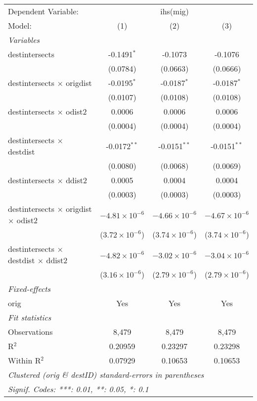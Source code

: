 \begin{tabular}{lccc}
\tabularnewline\midrule\midrule
Dependent Variable:&\multicolumn{3}{c}{ihs(mig)}\\
Model:&(1) & (2) & (3)\\
\midrule \emph{Variables}&   &   &  \\
destintersects & -0.1491$^{*}$ & -0.1073 & -0.1076\\
  &(0.0784) & (0.0663) & (0.0666)\\
destintersects $\times $ origdist & -0.0195$^{*}$ & -0.0187$^{*}$ & -0.0187$^{*}$\\
  &(0.0107) & (0.0108) & (0.0108)\\
destintersects $\times $ odist2 & 0.0006 & 0.0006 & 0.0006\\
  &(0.0004) & (0.0004) & (0.0004)\\
destintersects $\times $ destdist & -0.0172$^{**}$ & -0.0151$^{**}$ & -0.0151$^{**}$\\
  &(0.0080) & (0.0068) & (0.0069)\\
destintersects $\times $ ddist2 & 0.0005 & 0.0004 & 0.0004\\
  &(0.0003) & (0.0003) & (0.0003)\\
destintersects $\times $ origdist $\times $ odist2 & $-4.81\times 10^{-6}$ & $-4.66\times 10^{-6}$ & $-4.67\times 10^{-6}$\\
  &($3.72\times 10^{-6}$) & ($3.74\times 10^{-6}$) & ($3.74\times 10^{-6}$)\\
destintersects $\times $ destdist $\times $ ddist2 & $-4.82\times 10^{-6}$ & $-3.02\times 10^{-6}$ & $-3.04\times 10^{-6}$\\
  &($3.16\times 10^{-6}$) & ($2.79\times 10^{-6}$) & ($2.79\times 10^{-6}$)\\
\midrule \emph{Fixed-effects}&   &   &  \\
orig & Yes & Yes & Yes\\
\midrule \emph{Fit statistics}&  & & \\
Observations & 8,479&8,479&8,479\\
R$^2$ & 0.20959&0.23297&0.23298\\
Within R$^2$ & 0.07929&0.10653&0.10653\\
\midrule\midrule\multicolumn{4}{l}{\emph{Clustered (orig \& destID) standard-errors in parentheses}}\\
\multicolumn{4}{l}{\emph{Signif. Codes: ***: 0.01, **: 0.05, *: 0.1}}\\
\end{tabular}


